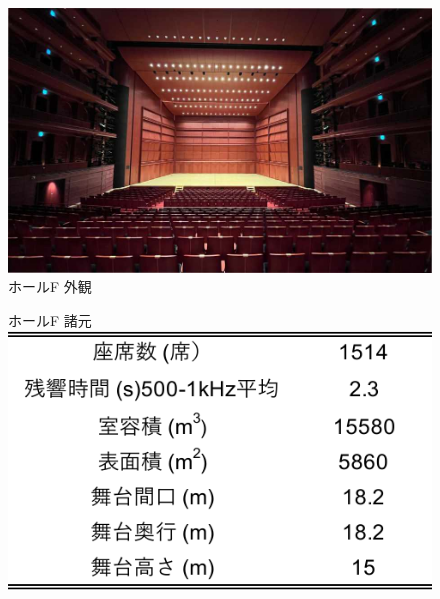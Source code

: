 \documentclass[11pt,a4j]{jreport}
\begin{document}
\begin{figure}[H]
  \begin{minipage}{0.5\textwidth} %
    \centering
    \includegraphics[width=.8\linewidth]{images/measuredHalls/resized/picture_f.jpg}
    \\ホールF 外観
    \vspace{2\baselineskip}

    ホールF 諸元\\
    \includegraphics[width=.8\linewidth]{images/measuredHalls/informationTable/f.pdf}
    \vspace{2\baselineskip}


\end{minipage}
\end{figure}
\end{document}
